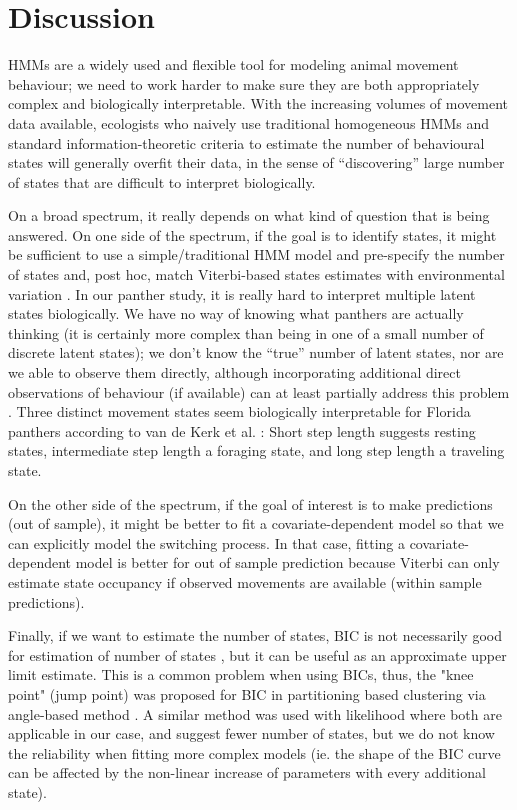 \documentclass{bmcart}
\begin{document}
\section*{Discussion}

HMMs are a widely used and flexible tool for modeling animal movement
behaviour; we need to work harder to make sure they are both appropriately
complex and biologically interpretable. 
With the increasing volumes of movement data available,
ecologists who naively use traditional homogeneous HMMs
and standard information-theoretic criteria
to estimate the number of behavioural states will generally
overfit their data, in the sense of ``discovering'' large
number of states that are difficult to interpret biologically.


On a broad spectrum, it really depends on what kind of question 
that is being answered. On one side of the spectrum, if the goal is 
to identify states, it might be sufficient to use a 
simple/traditional HMM model and pre-specify the number of states and, post hoc, 
match Viterbi-based states estimates with environmental variation 
\cite{fryxell_multiple_2008}. In our panther study, it is really hard to interpret multiple latent states biologically.
We have no way of knowing what panthers are actually
thinking (it is certainly more complex than being in one of a small
number of discrete latent states); 
we don't know the ``true'' number of latent states,
nor are we able to observe them directly, although
incorporating additional direct observations of 
behaviour (if available) can at least partially
address this problem \cite{fryxell_multiple_2008}.
Three distinct
movement states seem biologically interpretable for Florida panthers
according to van de Kerk et al. \cite{kerk2015hidden}: Short step length suggests resting
states, intermediate step length a foraging state, and long
step length a traveling state. 

On the other side of the 
spectrum, if the goal of interest is to make predictions (out of sample), 
it might be better to fit a covariate-dependent model so that we can explicitly
model the switching process. In that case, fitting a covariate-dependent model is
better for out of sample prediction because Viterbi can only estimate state 
occupancy if observed movements are available (within sample predictions). 

Finally, if we want to estimate the number of states, BIC is not necessarily 
good for estimation of number of states \cite{biernacki2000assessing}, 
but it can be useful as an approximate upper limit estimate. This is a common problem when using BICs, thus, the "knee point" (jump point) was proposed for BIC in partitioning based clustering via angle-based method \cite{zhao_knee_2008}. A similar method was used with likelihood \cite{dean2012behavioural} where both are applicable in our case, and suggest fewer number of states, but we do not know the reliability when fitting more complex models (ie. the shape of the BIC curve can be affected by the non-linear increase of parameters with every additional state).
\end{document}

